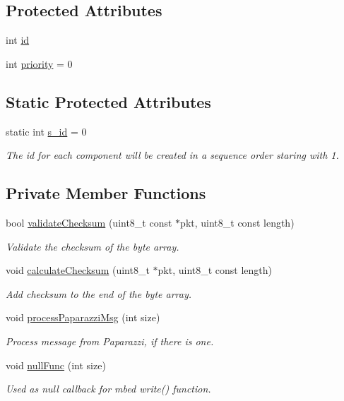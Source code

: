 \subsection*{Protected Attributes}
\begin{DoxyCompactItemize}
\item 
int \hyperlink{class_abstract_component_a9c9c548149681b1a1dd935e66ed5dd11}{id}
\item 
int \hyperlink{class_abstract_component_aff57dfa5f31be093a06b55560e33fb95}{priority} = 0
\end{DoxyCompactItemize}
\subsection*{Static Protected Attributes}
\begin{DoxyCompactItemize}
\item 
static int \hyperlink{class_abstract_component_a99ce3e5fe7d73dac569b874c15fcaf0d}{s\+\_\+id} = 0
\begin{DoxyCompactList}\small\item\em The id for each component will be created in a sequence order staring with 1. \end{DoxyCompactList}\end{DoxyCompactItemize}
\subsection*{Private Member Functions}
\begin{DoxyCompactItemize}
\item 
bool \hyperlink{class_u_a_r_t_messenger_a8e90d75bc44daee10b5d6cf70e1c1fb4}{validate\+Checksum} (uint8\+\_\+t const $\ast$pkt, uint8\+\_\+t const length)
\begin{DoxyCompactList}\small\item\em Validate the checksum of the byte array. \end{DoxyCompactList}\item 
void \hyperlink{class_u_a_r_t_messenger_a21e6194acf3039eafdbb4e4c3b7876a3}{calculate\+Checksum} (uint8\+\_\+t $\ast$pkt, uint8\+\_\+t const length)
\begin{DoxyCompactList}\small\item\em Add checksum to the end of the byte array. \end{DoxyCompactList}\item 
void \hyperlink{class_u_a_r_t_messenger_a3ae1cd91810b34f89244cd157c436c3c}{process\+Paparazzi\+Msg} (int size)
\begin{DoxyCompactList}\small\item\em Process message from Paparazzi, if there is one. \end{DoxyCompactList}\item 
void \hyperlink{class_u_a_r_t_messenger_a91aa0a571db31d7a0a7f2535a97c30c3}{null\+Func} (int size)
\begin{DoxyCompactList}\small\item\em Used as null callback for mbed write() function. \end{DoxyCompactList}\end{DoxyCompactItemize}
